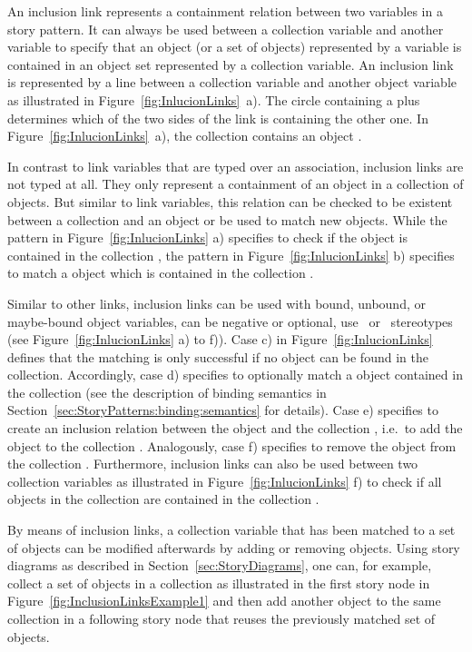 An inclusion link represents a containment relation between two variables in a story pattern.
It can always be used between a collection variable and another variable to specify that
an object (or a set of objects) represented by a variable is contained in an object set represented by a collection variable.
An inclusion link is represented by a line between a collection variable and another object
variable as illustrated in Figure~\ref{fig:InlucionLinks}~a).
The circle containing a plus determines which of the two sides of the link is containing the other one.
In Figure~\ref{fig:InlucionLinks}~a), the collection  contains an object .

In contrast to link variables that are typed over an association, inclusion links are not typed at all.
They only represent a containment of an object in a collection of objects.
But similar to link variables, this relation can be checked to be existent between a collection and an object
or be used to match new objects.
While the pattern in Figure~\ref{fig:InlucionLinks} a) specifies to check if the object  is contained in the collection ,
the pattern in Figure~\ref{fig:InlucionLinks} b) specifies to match a  object which is contained in the collection .

Similar to other links, inclusion links can be used with bound, unbound, or maybe-bound object variables, can be negative or optional, use
\create\ or \destroy\ stereotypes (see Figure~\ref{fig:InlucionLinks} a) to f)).
Case c) in Figure~\ref{fig:InlucionLinks} defines that the matching is only successful if no  object can be found in the  collection.
Accordingly, case d) specifies to optionally match a  object contained in the  collection
(see the description of binding semantics in Section~\ref{sec:StoryPatterns:binding:semantics} for details).
Case e) specifies to create an inclusion relation between the object  and the collection ,
i.e.\ to add the object  to the collection .
Analogously, case f) specifies to remove the object  from the collection .
Furthermore, inclusion links can also be used between two collection variables as illustrated in Figure~\ref{fig:InlucionLinks} f)
to check if all objects in the collection  are contained in the collection .

By means of inclusion links, a collection variable that has been matched to a set of objects
can be modified afterwards by adding or removing objects.
Using story diagrams as described in Section~\ref{sec:StoryDiagrams},
one can, for example, collect a set of  objects in a collection 
as illustrated in the first story node in Figure~\ref{fig:InclusionLinksExample1}
and then add another  object to the same collection in a following story node that reuses the previously matched set of objects.


